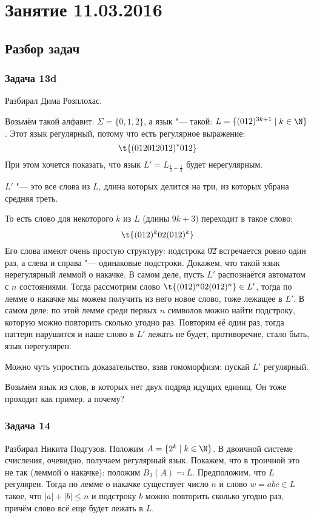 \chapter{Занятие 11.03.2016}
\section{Разбор задач}

\subsection{Задача 13d}
	Разбирал Дима Розплохас.

	Возьмём такой алфавит: $\Sigma=\{0,1,2\}$,
	а язык "--- такой: $L = \{(012)^{3k+1} \mid k \in \N \}$.
	Этот язык регулярный, потому что есть регулярное выражение:
	\[ \t{(012012012)^*012} \]
	При этом хочется показать, что язык $L'=L_{\frac13-\frac13}$ будет нерегулярным.
	\begin{Rem}
		$L'$ "--- это все слова из $L$, длина которых делится на три, из которых убрана средняя треть.
	\end{Rem}
	То есть слово для некоторого $k$ из $L$ (длины $9k+3$) переходит в такое слово:
	\[ \t{(012)^k02(012)^k} \]
	Его слова имеют очень простую структуру: подстрока \t{02} встречается ровно один раз,
	а слева и справа "--- одинаковые подстроки.
	Докажем, что такой язык нерегулярный леммой о накачке.
	В самом деле, пусть $L'$ распознаётся автоматом с $n$ состояниями.
	Тогда рассмотрим слово $\t{(012)^n02(012)^n} \in L'$, тогда по лемме о накачке мы можем
	получить из него новое слово, тоже лежащее в $L'$.
	В самом деле: по этой лемме среди первых $n$ символов можно найти подстроку,
	которую можно повторить сколько угодно раз.
	Повторим её один раз, тогда паттерн нарушится и наше слово в $L'$ лежать не будет,
	противоречие, стало быть, язык нерегулярен.

	\begin{Rem}
		Можно чуть упростить доказательство, взяв гомоморфизм:
		пускай $L'$ регулярный.
		\TODO
	\end{Rem}

	\begin{Rem}
		Возьмём язык из слов, в которых нет двух подряд идущих единиц.
		Он тоже проходит как пример.
		\TODO а почему?
	\end{Rem}

\subsection{Задача 14}
	Разбирал Никита Подгузов.
	Положим $A = \{ 2^k \mid k \in \N \}$.
	В двоичной системе счисления, очевидно, получаем регулярный язык.
	Покажем, что в троичной это не так (леммой о накачке): положим $B_3(A) \eqcolon L$.
	Предположим, что $L$ регулярен.
	Тогда по лемме о накачке существует число $n$ и слово $w=\overline{abc} \in L$ такое, что $|a|+|b| \le n$
	и подстроку $b$ можно повторить сколько угодно раз, причём слово всё еще будет лежать в $L$.

